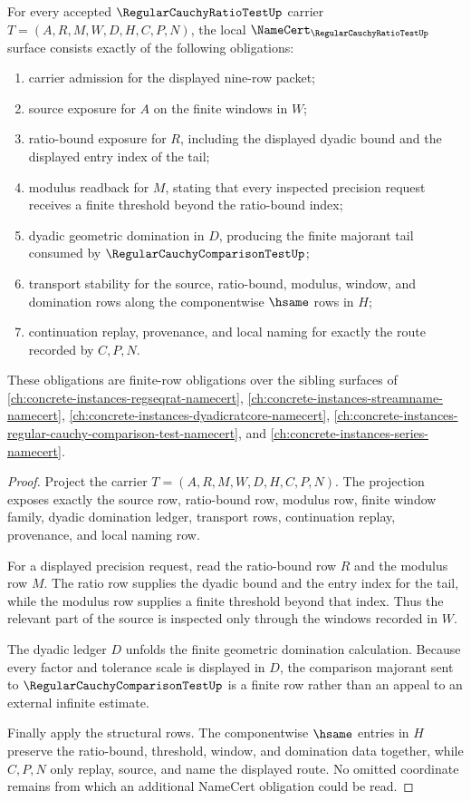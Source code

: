 \begin{theorem}
\label{thm:regular-cauchy-ratio-test-namecert-obligations}
For every accepted $\RegularCauchyRatioTestUp$ carrier $T=(A,R,M,W,D,H,C,P,N)$, the local $\NameCert_{\RegularCauchyRatioTestUp}$ surface consists exactly of the following obligations:
\begin{enumerate}
\item carrier admission for the displayed nine-row packet;
\item source exposure for $A$ on the finite windows in $W$;
\item ratio-bound exposure for $R$, including the displayed dyadic bound and the displayed entry index of the tail;
\item modulus readback for $M$, stating that every inspected precision request receives a finite threshold beyond the ratio-bound index;
\item dyadic geometric domination in $D$, producing the finite majorant tail consumed by $\RegularCauchyComparisonTestUp$;
\item transport stability for the source, ratio-bound, modulus, window, and domination rows along the componentwise $\hsame$ rows in $H$;
\item continuation replay, provenance, and local naming for exactly the route recorded by $C,P,N$.
\end{enumerate}
These obligations are finite-row obligations over the sibling surfaces of \autoref{ch:concrete-instances-regseqrat-namecert}, \autoref{ch:concrete-instances-streamname-namecert}, \autoref{ch:concrete-instances-dyadicratcore-namecert}, \autoref{ch:concrete-instances-regular-cauchy-comparison-test-namecert}, and \autoref{ch:concrete-instances-series-namecert}.
\end{theorem}
\begin{proof}
Project the carrier $T=(A,R,M,W,D,H,C,P,N)$. The projection exposes exactly the source row, ratio-bound row, modulus row, finite window family, dyadic domination ledger, transport rows, continuation replay, provenance, and local naming row.

For a displayed precision request, read the ratio-bound row $R$ and the modulus row $M$. The ratio row supplies the dyadic bound and the entry index for the tail, while the modulus row supplies a finite threshold beyond that index. Thus the relevant part of the source is inspected only through the windows recorded in $W$.

The dyadic ledger $D$ unfolds the finite geometric domination calculation. Because every factor and tolerance scale is displayed in $D$, the comparison majorant sent to $\RegularCauchyComparisonTestUp$ is a finite row rather than an appeal to an external infinite estimate.

Finally apply the structural rows. The componentwise $\hsame$ entries in $H$ preserve the ratio-bound, threshold, window, and domination data together, while $C,P,N$ only replay, source, and name the displayed route. No omitted coordinate remains from which an additional NameCert obligation could be read.
\end{proof}

